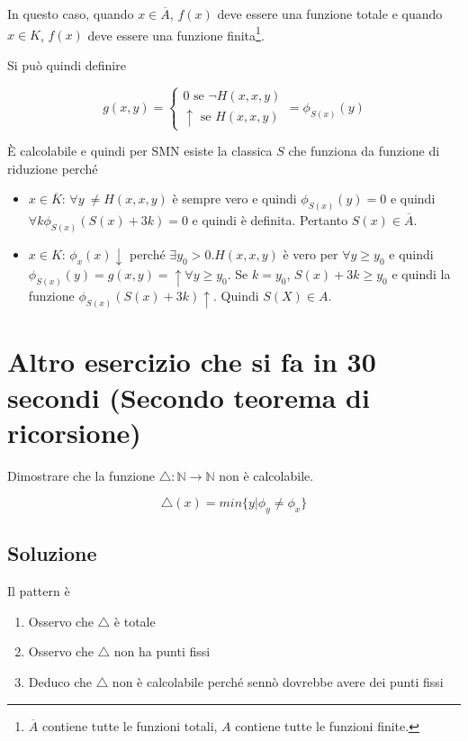 In questo caso, quando $x \in \overline{A}$, $f(x)$ deve essere una funzione totale e quando $x \in K$, $f(x)$ deve essere una funzione finita\footnote{$\overline{A}$ contiene tutte le funzioni totali, $A$ contiene tutte le funzioni finite.}.

Si può quindi definire

$$
g(x,y) = \begin{cases}
0 \text{ se } \neg H(x,x,y) \\
\uparrow \text{ se } H(x,x,y)
\end{cases} = \phi_{S(x)}(y)
$$

\`{E} calcolabile e quindi per SMN esiste la classica $S$ che funziona da funzione di riduzione perché

\begin{itemize}
	\item $x \in \overline{K}$: $\forall y \: \neq H(x,x,y)$ è sempre vero e quindi $\phi_{S(x)}(y) = 0$ e quindi $\forall k \phi_{S(x)}(S(x)+3k) = 0$ e quindi è definita. Pertanto $S(x) \in \overline{A}$.
	\item $x \in K$: $\phi_x(x) \downarrow$ perché $\exists y_0 > 0 . H(x,x,y)$ è vero per $\forall y \geq y_0$ e quindi $\phi_{S(x)}(y) = g(x,y) = \uparrow \forall y \geq y_0$. Se $k = y_0$, $S(x) + 3k \geq y_0$ e quindi la funzione $\phi_{S(x)} (S(x) + 3k) \uparrow$. Quindi $S(X) \in A$.
\end{itemize}

\section{Altro esercizio che si fa in 30 secondi (Secondo teorema di ricorsione)}
 
Dimostrare che la funzione $ \bigtriangleup : \mathbb{N} \rightarrow \mathbb{N}$ non è calcolabile.

$$
\bigtriangleup (x) = min \{  y | \phi_y \neq \phi_x \}
$$

\subsection{Soluzione}

Il pattern è 
\begin{enumerate}
	\item Osservo che $\bigtriangleup$ è totale
	\item Osservo che $\bigtriangleup$ non ha punti fissi
	\item Deduco che $\bigtriangleup$ non è calcolabile perché sennò dovrebbe avere dei punti fissi
\end{enumerate}


